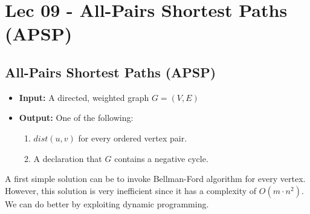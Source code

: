 \chapter{Lec 09 - All-Pairs Shortest Paths (APSP)}

\section{All-Pairs Shortest Paths (APSP)}
\begin{itemize}
    \item \textbf{Input:} A directed, weighted graph $G = (V, E)$
    \item \textbf{Output:} One of the following:
    \begin{enumerate}
        \item $dist(u, v)$ for every ordered vertex pair.
        \item A declaration that $G$ contains a negative cycle.
    \end{enumerate}
\end{itemize}
A first simple solution can be to invoke Bellman-Ford algorithm for every vertex. However, this solution is very inefficient since it has a complexity of $O(m \cdot n^2)$.\newline\newline
We can do better by exploiting dynamic programming.
